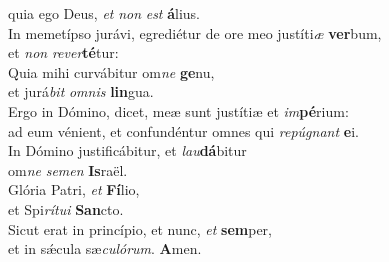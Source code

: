 \evenverse quia ego Deus, \textit{et} \textit{non} \textit{est} \textbf{á}lius.\\
\oddverse In memetípso jurávi, egrediétur de ore meo justíti\textit{æ} \textbf{ver}bum,~\*\\
\oddverse et \textit{non} \textit{re}\textit{ver}\textbf{té}tur:\\
\evenverse Quia mihi curvábitur om\textit{ne} \textbf{ge}nu,~\*\\
\evenverse et jurá\textit{bit} \textit{om}\textit{nis} \textbf{lin}gua.\\
\oddverse Ergo in Dómino, dicet, meæ sunt justítiæ et \textit{im}\textbf{pé}rium:~\*\\
\oddverse ad eum vénient, et confundéntur omnes qui \textit{re}\textit{pú}\textit{gnant} \textbf{e}i.\\
\evenverse In Dómino justificábitur, et \textit{lau}\textbf{dá}bitur~\*\\
\evenverse om\textit{ne} \textit{se}\textit{men} \textbf{Is}raël.\\
\oddverse Glória Patri, \textit{et} \textbf{Fí}lio,~\*\\
\oddverse et Spi\textit{rí}\textit{tu}\textit{i} \textbf{San}cto.\\
\evenverse Sicut erat in princípio, et nunc, \textit{et} \textbf{sem}per,~\*\\
\evenverse et in sǽcula sæ\textit{cu}\textit{ló}\textit{rum}. \textbf{A}men.\\
